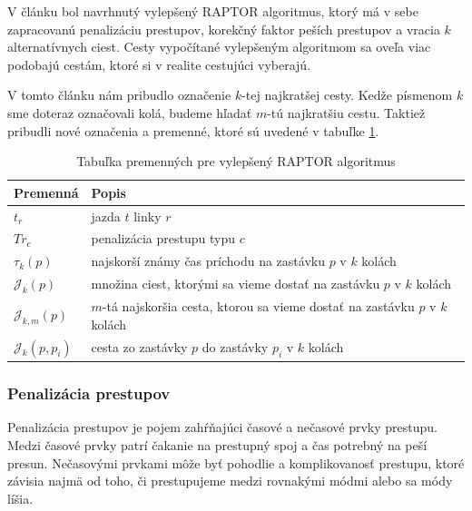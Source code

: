 V článku \cite{improvedRaptor} bol navrhnutý vylepšený RAPTOR algoritmus, ktorý má v sebe zapracovanú penalizáciu prestupov, korekčný faktor peších prestupov a vracia $k$ alternatívnych ciest. Cesty vypočítané vylepšeným algoritmom sa oveľa viac podobajú cestám, ktoré si v realite cestujúci vyberajú.

V tomto článku nám pribudlo označenie $k$-tej najkratšej cesty. Kedže písmenom $k$ sme doteraz označovali kolá, budeme hľadať $m$-tú najkratšiu cestu. Taktiež pribudli nové označenia a premenné, ktoré sú uvedené v tabuľke \ref{table:raptor-variables}.

\begin{table}[H]
\begin{tabular}{|l|l|}
\hline
\rowcolor[HTML]{C0C0C0} 
\textbf{Premenná} & \textbf{Popis} \\ \hline
$t_r$             & jazda $t$ linky $r$          \\ \hline
$Tr_c$             & penalizácia prestupu typu $c$          \\ \hline
$\tau_k(p)$			& najskorší známy čas príchodu na zastávku $p$ v $k$ kolách \\ \hline
$\mathcal{J}_k(p)$ & množina ciest, ktorými sa vieme dostať na zastávku $p$ v $k$ kolách \\ \hline
$\mathcal{J}_{k,m}(p)$ & $m$-tá najskoršia cesta, ktorou sa vieme dostať na zastávku $p$ v $k$ kolách \\ \hline
$\mathcal{J}_k(p, p_i)$ & cesta zo zastávky $p$ do zastávky $p_i$ v $k$ kolách \\ \hline
\end{tabular}
\caption{Tabuľka premenných pre vylepšený RAPTOR algoritmus}
\label{table:raptor-variables}
\end{table}

\subsubsection{Penalizácia prestupov}
Penalizácia prestupov je pojem zahŕňajúci časové a nečasové prvky prestupu. Medzi časové prvky patrí čakanie na prestupný spoj a čas potrebný na peší presun. Nečasovými prvkami môže byť pohodlie a komplikovanosť prestupu, ktoré závisia najmä od toho, či prestupujeme medzi rovnakými módmi alebo sa módy líšia. 

